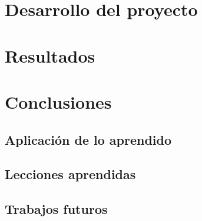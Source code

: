 \documentclass[a4paper, 12pt]{book}
\begin{document}
\cleardoublepage
\chapter{Desarrollo del proyecto}
\label{chap:Desarrollo del proyecto}



\cleardoublepage
\chapter{Resultados}
\label{chap:resultados}



\cleardoublepage
\chapter{Conclusiones}
\label{chap:conclusiones}


\section{Aplicación de lo aprendido}
\label{sec:aplicacion}



\section{Lecciones aprendidas}
\label{sec:lecciones_aprendidas}


\section{Trabajos futuros}
\label{sec:trabajos_futuros}


\cleardoublepage


\end{document}
